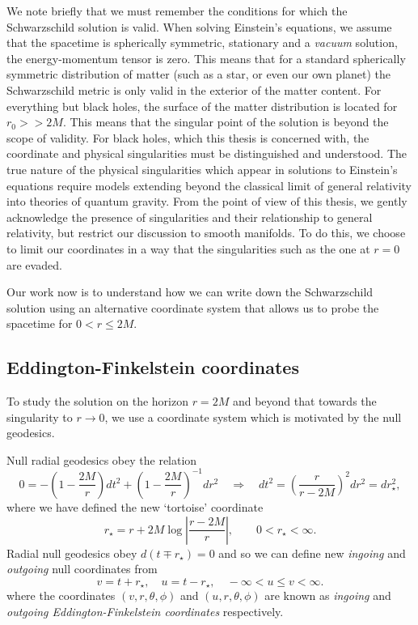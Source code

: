 We note briefly that we must remember the conditions for which the Schwarzschild solution is valid. When solving Einstein's equations, we assume that the spacetime is spherically symmetric, stationary and a \emph{vacuum} solution, \ie the energy-momentum tensor is zero. This means that for a standard spherically symmetric distribution of matter (such as a star, or even our own planet) the Schwarzschild metric is only valid in the exterior of the matter content. For everything but black holes, the surface of the matter distribution is located for $r_0 >> 2M$. This means that the singular point of the solution is beyond the scope of validity. For black holes, which this thesis is concerned with, the coordinate and physical singularities must be distinguished and understood. The true nature of the physical singularities which appear in solutions to Einstein's equations require models extending beyond the classical limit of general relativity into theories of quantum gravity. From the point of view of this thesis, we gently acknowledge the presence of singularities and their relationship to general relativity, but restrict our discussion to smooth manifolds. To do this, we choose to limit our coordinates in a way that the singularities such as the one at $r = 0$ are evaded.

Our work now is to understand how we can write down the Schwarzschild solution using an alternative coordinate system that allows us to probe the spacetime for $0 < r \leq 2M$. 


\subsection{Eddington-Finkelstein coordinates}
\label{sec:scheddington}

To study the \sch solution on the horizon $r = 2M$ and beyond that towards the singularity to $r \rightarrow 0$, we use a coordinate system which is motivated by the null geodesics. 

Null radial geodesics obey the relation 
\begin{equation*}
	0 = - \left( 1 - \frac{2M}{r} \right) dt^2 + \left( 1 - \frac{2M}{r} \right)^{-1} dr^2 \quad \Rightarrow \quad
	dt^2 = \left( \frac{r}{r - 2M} \right)^2 dr^2 = dr^2_\star,
\end{equation*}
where we have defined the new `tortoise' coordinate
\begin{equation*}
	r_\star = r + 2M \log \left| \frac{r - 2M}{r} \right|, \qquad 0 < r_\star < \infty.
\end{equation*}
Radial null geodesics obey $d(t \mp r_\star) = 0$ and so we can define new \emph{ingoing} and \emph{outgoing} null coordinates from
\begin{equation*}
	v = t + r_\star, \quad u = t - r_\star, \quad -\infty < u \leq v < \infty.
\end{equation*}
where the coordinates $(v,r, \theta, \phi)$ and $(u,r, \theta, \phi)$ are known as \emph{ingoing} and \emph{outgoing Eddington-Finkelstein coordinates} respectively.


